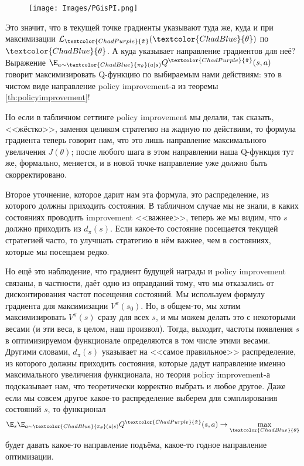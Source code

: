 \begin{wrapfigure}{r}{0.35\textwidth}
\centering
\texttt{[image: Images/PGisPI.png]}
\vspace{-0.5cm}
\end{wrapfigure}

Это значит, что в текущей точке градиенты указывают туда же, куда и при максимизации $\mathcal{L}_{\textcolor{ChadPurple}{\tilde{\pi}}}(\textcolor{ChadBlue}{\theta})$ по $\textcolor{ChadBlue}{\theta}$. А куда указывает направление градиентов для неё? Выражение $\E_{a \sim \textcolor{ChadBlue}{\pi_{\theta}}(a \mid s)} Q^{\textcolor{ChadPurple}{\tilde{\pi}}}(s, a)$ говорит максимизировать Q-функцию по выбираемым нами действиям: это в чистом виде направление policy improvement-а из теоремы \ref{th:policyimprovement}! 

Но если в табличном сеттинге policy improvement мы делали, так сказать, <<жёстко>>, заменяя целиком стратегию на жадную по действиям, то формула градиента теперь говорит нам, что это лишь направление максимального увеличения $J(\theta)$; после любого шага в этом направлении наша Q-функция тут же, формально, меняется, и в новой точке направление уже должно быть скорректировано. 

Второе уточнение, которое дарит нам эта формула, это распределение, из которого должны приходить состояния. В табличном случае мы не знали, в каких состояниях проводить improvement <<важнее>>, теперь же мы видим, что $s$ должно приходить из $d_{\pi}(s)$. Если какое-то состояние посещается текущей стратегией часто, то улучшать стратегию в нём важнее, чем в состояниях, которые мы посещаем редко.

Но ещё это наблюдение, что градиент будущей награды и policy improvement связаны, в частности, даёт одно из оправданий тому, что мы отказались от дисконтирования частот посещения состояний. Мы используем формулу градиента для максимизации $V^\pi(s_0)$. Но, в общем-то, мы хотим максимизировать $V^\pi(s)$ сразу для всех $s$, и мы можем делать это с некоторыми весами (и эти веса, в целом, наш произвол). Тогда, выходит, частоты появления $s$ в оптимизируемом функционале определяются в том числе этими весами. Другими словами, $d_{\pi}(s)$ указывает на <<самое правильное>> распределение, из которого должны приходить состояния, которые дадут направление именно максимального увеличения функционала, но теория policy improvement-а подсказывает нам, что теоретически корректно выбрать и любое другое. Даже если мы совсем другое какое-то распределение выберем для сэмплирования состояний $s$, то функционал
$$\E_{s} \E_{a \sim \textcolor{ChadBlue}{\pi_{\theta}}(a \mid s)} Q^{\textcolor{ChadPurple}{\tilde{\pi}}}(s, a) \to \max_{\textcolor{ChadBlue}{\theta}}$$
будет давать какое-то направление подъёма, какое-то годное направление оптимизации. 

